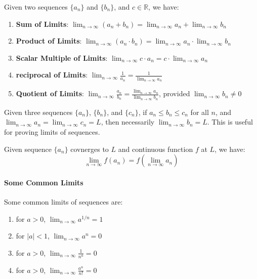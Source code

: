 \documentclass[11pt]{article}
\begin{document}
\begin{theorem}
    Given two sequences $\{a_n\}$ and $\{b_n\}$, and $c \in \mathbb{R}$, we have:
    \begin{enumerate}
        \item \textbf{Sum of Limits}: $\lim_{n \to \infty} (a_n + b_n) = \lim_{n \to \infty} a_n + \lim_{n \to \infty} b_n$
        \item \textbf{Product of Limits}: $\lim_{n \to \infty} (a_n \cdot b_n) = \lim_{n \to \infty} a_n \cdot \lim_{n \to \infty} b_n$
        \item \textbf{Scalar Multiple of Limits}: $\lim_{n \to \infty} c \cdot a_n = c \cdot \lim_{n \to \infty} a_n$
        \item \textbf{reciprocal of Limits}: $\lim_{n \to \infty} \frac{1}{a_n} = \frac{1}{\lim_{n \to \infty} a_n}$
        \item \textbf{Quotient of Limits}: $\lim_{n \to \infty} \frac{a_n}{b_n} = \frac{\lim_{n \to \infty} a_n}{\lim_{n \to \infty} b_n}$, provided $\lim_{n \to \infty} b_n \neq 0$
    \end{enumerate}
\end{theorem}
\begin{theorem}
    Given three sequences $\{a_n\}$, $\{b_n\}$, and $\{c_n\}$, if $a_n \le b_n \le c_n$ for all $n$, and $\lim_{n \to \infty} a_n = \lim_{n \to \infty} c_n = L$, then necessarily $\lim_{n \to \infty} b_n = L$. This is useful for proving limits of sequences.
\end{theorem}
\begin{theorem}
    Given sequence $\{a_n\}$ covnerges to $L$ and continuous function $f$ at $L$, we have:
    \begin{equation}
        \lim_{n \to \infty} f(a_n) = f(\lim_{n \to \infty} a_n)
    \end{equation}
\end{theorem}
\paragraph{Some Common Limits} Some common limits of sequences are:
\begin{enumerate}
    \item for $a > 0$, $\lim_{n \to \infty} a^{1/n} = 1$
    \item for $|a| < 1$, $\lim_{n \to \infty} a^n = 0$
    \item for $a > 0$, $\lim_{n \to \infty} \frac{1}{n^a} = 0$
    \item for $a > 0$, $\lim_{n \to \infty} \frac{a^n}{n!} = 0$
\end{enumerate}
\end{document}
